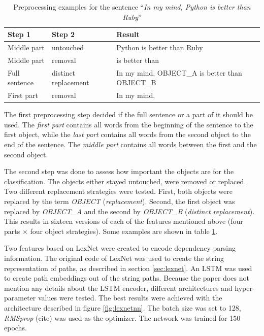 \begin{table}[ht]
\centering

\caption{Preprocessing examples for the sentence \enquote{\emph{In my mind, Python is better than Ruby}}}
\label{preprocessing_example}
\begin{tabularx}{\linewidth}{llX}
\toprule
Step 1 & Step 2 & Result \\ \midrule
Middle part & untouched & Python is better than Ruby \\
Middle part & removal & is better than \\
Full sentence & distinct replacement &In my mind, OBJECT\_A is better than OBJECT\_B \\
First part & removal & In my mind, \\
\bottomrule
\end{tabularx}

\end{table}

The first preprocessing step decided if the full sentence or a part of it should be used. The \emph{first part} contains all words from the beginning of the sentence to the first object, while the \emph{last part} contains all words from the second object to the end of the sentence. The \emph{middle part} contains all words between the first and the second object.

The second step was done to assess how important the objects are for the classification. The objects either stayed untouched, were removed or replaced. Two different replacement strategies were tested. First, both objects were replaced by the term \emph{OBJECT} (\emph{replacement}). Second, the first object was replaced by \emph{OBJECT\_A} and the second by \emph{OBJECT\_B} (\emph{distinct replacement}). This results in sixteen versions of each of the features mentioned above (four parts $\times$ four object strategies). Some examples are shown in table \ref{preprocessing_example}.\newline


\label{sec:lexnet_feat_desc}
Two features based on LexNet were created to encode dependency parsing information. The original code of LexNet was used to create the string representation of paths, as described in section \ref{sec:lexnet}. An LSTM was used to create path embeddings out of the string paths. Because the paper does not mention any details about the LSTM encoder, different architectures and hyper-parameter values were tested. The best results were achieved with the architecture described in figure \ref{fig:lexnetnn}. The batch  size was set to 128, \emph{RMSprop} (cite) was used as the optimizer. The network was trained for 150 epochs.

